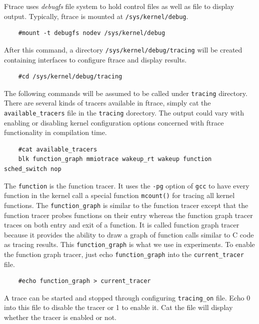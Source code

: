 Ftrace uses \emph{debugfs} file system to hold control files as well as
file to display output. 
Typically, ftrace is mounted at \texttt{/sys/kernel/debug}.
\begin{lstlisting}
	#mount -t debugfs nodev /sys/kernel/debug
\end{lstlisting}
After this command, a directory \texttt{/sys/kernel/debug/tracing} will 
be created containing interfaces to configure ftrace and display results.
\begin{lstlisting}
	#cd /sys/kernel/debug/tracing
\end{lstlisting}
The following commands will be assumed to be called under \texttt{tracing}
directory.
There are several kinds of tracers available in ftrace, simply cat the
\texttt{available\_tracers} file in the \texttt{tracing} dorectory.
The output could vary with enabling or disabling kernel configuration 
options concerned with ftrace functionality in compilation time.
\begin{lstlisting}
	#cat available_tracers
	blk function_graph mmiotrace wakeup_rt wakeup function sched_switch nop
\end{lstlisting}
The \texttt{function} is the function tracer. It uses the \texttt{-pg} option
of \texttt{gcc} to have every function in the kernel call a special function
\texttt{mcount()} for tracing all kernel functions. 
The \texttt{function\_graph} is similar to the function tracer except that
the function tracer probes functions on their entry whereas the function 
graph tracer traces on both entry and exit of a function. It is called 
function graph tracer because it provides the ability to draw a graph 
of function calls similar to C code as tracing results. 
This \texttt{function\_graph} is what we use in experiments. 
To enable the function graph tracer, just echo \texttt{function\_graph} 
into the \texttt{current\_tracer} file.
\begin{lstlisting}
	#echo function_graph > current_tracer
\end{lstlisting}
A trace can be started and stopped through configuring \texttt{tracing\_on}
file. Echo 0 into this file to disable the tracer or 1 to enable it. Cat the
file will display whether the tracer is enabled or not.

